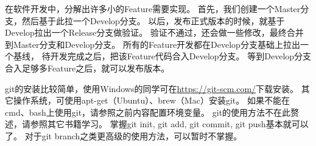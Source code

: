 在软件开发中，分解出许多小的Feature需要实现。
首先，我们创建一个Master分支，然后基于此拉一个Develop分支。
以后，发布正式版本的时候，就基于Develop拉出一个Release分支做验证。
验证不通过，还会做一些修改，最终合并到Master分支和Develop分支。
所有的Feature开发都在Develop分支基础上拉出一个基线，
待开发完成之后，把该Feature代码合入Develop分支。
等到Develop分支合入足够多Feature之后，就可以发布版本。

git的安装比较简单，使用Windows的同学可在\url{https://git-scm.com/}下载安装。
其它操作系统，可使用apt-get（Ubuntu）、brew（Mac）安装git。
如果不能在cmd、bash上使用git，请参照之前内容配置环境变量。
git的使用方法不在此赘述，请参照其它书籍学习。
掌握git init, git add, git commit, git push基本就可以了。
对于git branch之类更高级的使用方法，可以暂时不掌握。